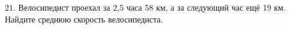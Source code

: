 21. Велосипедист проехал за 2,5 часа 58 км, а за следующий час ещё 19 км. Найдите среднюю скорость велосипедиста.\\
